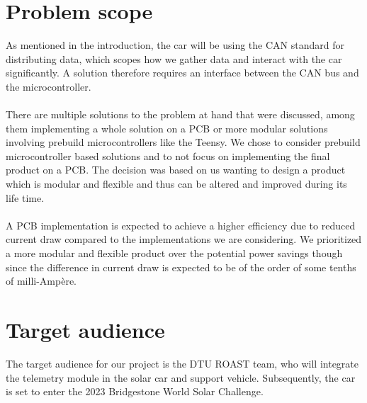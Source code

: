 \documentclass[]{article}
\begin{document}
\section{Problem scope}
As mentioned in the introduction, the car will be using the CAN standard for distributing data, which scopes how we gather data and interact with the car significantly. A solution therefore requires an interface between the CAN bus and the microcontroller.\\
\\
There are multiple solutions to the problem at hand that were discussed, among them implementing a whole solution on a PCB or more modular solutions involving prebuild microcontrollers like the Teensy\cite{teensy}. We chose to consider prebuild microcontroller based solutions and to not focus on implementing the final product on a PCB. The decision was based on us wanting to design a product which is modular and flexible and thus can be altered and improved during its life time.\\
\\
A PCB implementation is expected to achieve a higher efficiency due to reduced current draw compared to the implementations we are considering. We prioritized a more modular and flexible product over the potential power savings though since the difference in current draw is expected to be of the order of some tenths of milli-Ampère.

\section{Target audience}
The target audience for our project is the DTU ROAST team, who will integrate the telemetry module in the solar car and support vehicle. Subsequently, the car is set to enter the 2023 Bridgestone World Solar Challenge.
\end{document}
